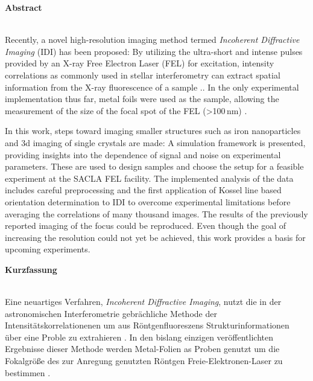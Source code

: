 	\begin{Huge}
		\textbf{Abstract}\vspace{12mm}
	\end{Huge}
\\
Recently, a novel high-resolution imaging method termed \textit{Incoherent Diffractive Imaging} (IDI) has been proposed: By utilizing the ultra-short and intense pulses provided by an X-ray Free Electron Laser (FEL) for excitation,  intensity correlations as commonly used in stellar interferometry can extract spatial information from the X-ray fluorescence of a sample \cite{classen2017}.. 
In the only experimental implementation thus far, metal foils were used as the sample, allowing the measurement of the size of the focal spot of the FEL (>100\,nm) \cite{nakumura2020}.

In this work, steps toward imaging smaller structures such as iron nanoparticles and 3d imaging of single crystals are made: A simulation framework is presented, providing insights into the dependence of signal and noise on experimental parameters. These are used to design samples and choose the setup for a feasible experiment at the SACLA FEL facility. The implemented analysis of the data includes careful preprocessing and the first application of Kossel line based orientation determination to IDI to overcome experimental limitations before averaging the correlations of many thousand images. The results of the previously reported imaging of the focus could be reproduced. 
Even though the goal of increasing the resolution could not yet be achieved, this work provides a basis for upcoming experiments.

 \vspace{1cm}
 
 \begin{Huge}
 	\textbf{Kurzfassung}\vspace{12mm}
 \end{Huge}
\\
Eine neuartiges Verfahren, \textit{Incoherent Diffractive Imaging}, nutzt die in der astronomischen Interferometrie gebrächliche Methode der Intensitätskorrelationenen um aus Röntgenfluoreszens Strukturinformationen über eine Proble zu extrahieren \cite{classen2017}.  
In den bislang einzigen veröffentlichten Ergebnisse dieser Methode werden Metal-Folien as Proben genutzt um die Fokalgröße des zur Anregung genutzten Röntgen Freie-Elektronen-Laser zu bestimmen \cite{nakumura2020}.

